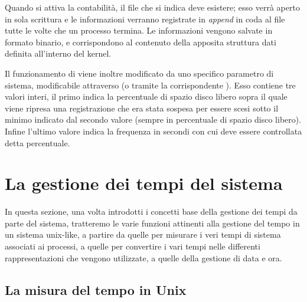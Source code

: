 Quando si attiva la contabilità, il file che si indica deve esistere; esso
verrà aperto in sola scrittura e le informazioni verranno registrate in
\textit{append} in coda al file tutte le volte che un processo termina. Le
informazioni vengono salvate in formato binario, e corrispondono al contenuto
della apposita struttura dati definita all'interno del kernel.

Il funzionamento di  viene inoltre modificato da uno specifico
parametro di sistema, modificabile attraverso  (o
tramite la corrispondente ). Esso contiene tre valori interi, il
primo indica la percentuale di spazio disco libero sopra il quale viene
ripresa una registrazione che era stata sospesa per essere scesi sotto il
minimo indicato dal secondo valore (sempre in percentuale di spazio disco
libero). Infine l'ultimo valore indica la frequenza in secondi con cui deve
essere controllata detta percentuale.



\section{La gestione dei tempi del sistema}
\label{sec:sys_time}

In questa sezione, una volta introdotti i concetti base della gestione dei
tempi da parte del sistema, tratteremo le varie funzioni attinenti alla
gestione del tempo in un sistema unix-like, a partire da quelle per misurare i
veri tempi di sistema associati ai processi, a quelle per convertire i vari
tempi nelle differenti rappresentazioni che vengono utilizzate, a quelle della
gestione di data e ora.


\subsection{La misura del tempo in Unix}
\label{sec:sys_unix_time}


